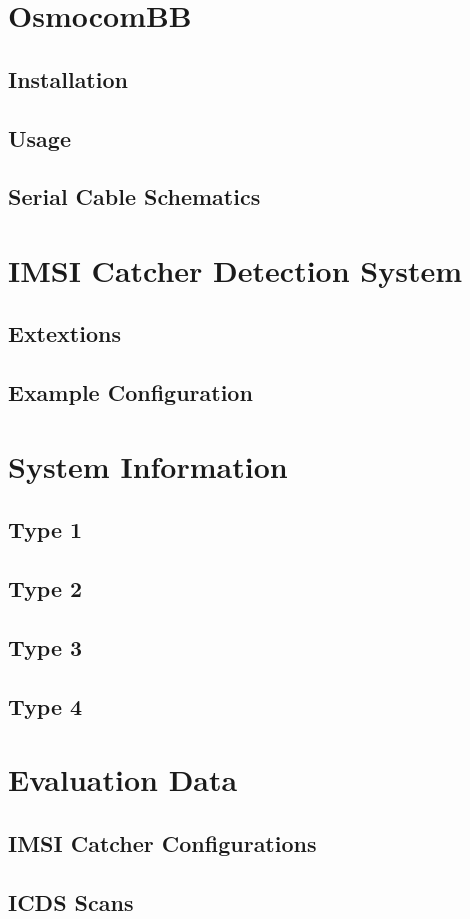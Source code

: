 \chapter{OsmocomBB}
\section{Installation}
\label{sec:osmo_install}
\section{Usage}
\label{sec:osmo_usage}
\section{Serial Cable Schematics}
\label{sec:osmo_serial_schematics}

\chapter{IMSI Catcher Detection System}
\section{Extextions}
\label{sec:extensions}
\section{Example Configuration}

\chapter{System Information}
\label{sec:system_infos}
\section{Type 1}
\section{Type 2}
\section{Type 3}
\section{Type 4}

\chapter{Evaluation Data}
\section{IMSI Catcher Configurations}
\section{ICDS Scans}